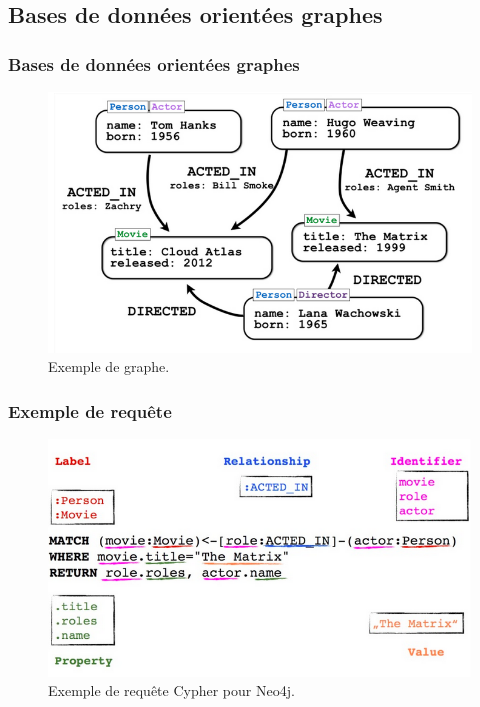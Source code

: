 	\subsection{Bases de données orientées graphes}
	\begin{frame}
		\frametitle{Bases de données orientées graphes}

		\begin{figure}[htb]
			\includegraphics[width=1\textwidth]{images/graphe.png}
			\caption{Exemple de graphe.}
		\end{figure}
	\end{frame}

	\begin{frame}
		\frametitle{Exemple de requête}

		\begin{figure}[htb]
			\includegraphics[width=1\textwidth]{images/requeteNeo4j.png}
			\caption{Exemple de requête Cypher pour Neo4j.}
		\end{figure}

	\end{frame}

